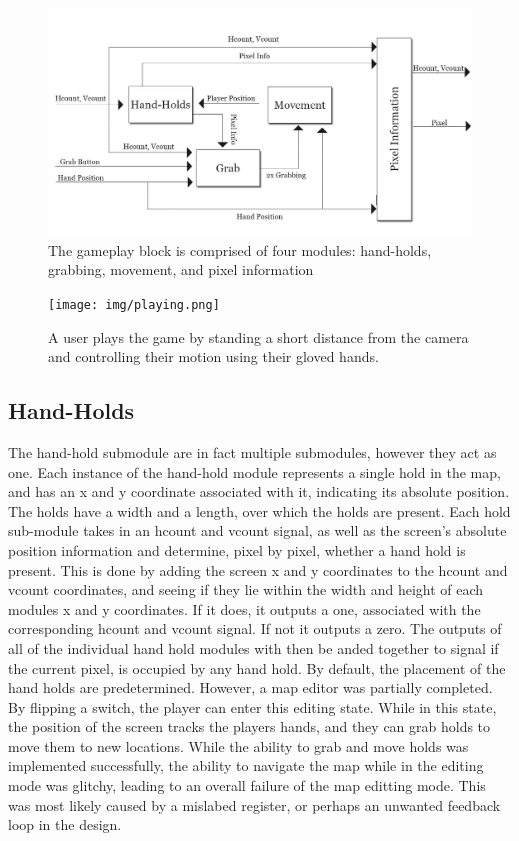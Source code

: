 \begin{figure}[h]
\centering
\includegraphics[width=6.5in]{img/gameplay.png}
\caption{The gameplay block is comprised of four modules: hand-holds, grabbing, movement, and pixel information}
\label{fig:gameplay}
\end{figure}

\begin{figure}[h]
\centering
\texttt{[image: img/playing.png]}
\caption{A user plays the game by standing a short distance from the camera and
controlling their motion using their gloved hands.}
\label{fig:playing}
\end{figure}

\subsection{Hand-Holds}

The hand-hold submodule are in fact multiple submodules, however they act as
one. Each instance of the hand-hold module represents a single hold in the map,
and has an x and y coordinate associated with it, indicating its absolute
position. The holds have a width and a length, over which the holds are present.
Each hold sub-module takes in an hcount and vcount signal, as well as the
screen's absolute position information and determine, pixel by pixel, whether a
hand hold is present. This is done by adding the screen x and y coordinates to
the hcount and vcount coordinates, and seeing if they lie within the width and
height of each modules x and y coordinates. If it does, it outputs a one,
associated with the corresponding hcount and vcount signal. If not it outputs a
zero. The outputs of all of the individual hand hold modules with then be anded
together to signal if the current pixel, is occupied by any hand hold. By
default, the placement of the hand holds are predetermined. However, a map
editor was partially completed. By flipping a switch, the player can enter this
editing state. While in this state, the position of the screen tracks the
players hands, and they can grab holds to move them to new locations. While the
ability to grab and move holds was implemented successfully, the ability to
navigate the map while in the editing mode was glitchy, leading to an overall
failure of the map editting mode. This was most likely caused by a mislabed
register, or perhaps an unwanted feedback loop in the design.



